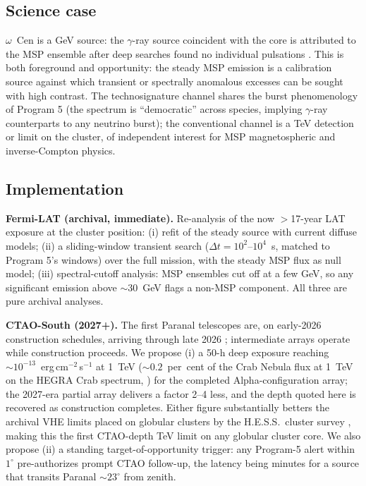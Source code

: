 \documentclass[11pt]{article}
\newcommand{\ocen}{\ensuremath{\omega}~Cen}
\begin{document}
\subsection{Science case}

\ocen{} is a GeV source: the $\gamma$-ray source coincident with the core is attributed to the MSP ensemble after deep searches found no individual pulsations \citep{Dai2020,Dai2023}. This is both foreground and opportunity: the steady MSP emission is a calibration source against which transient or spectrally anomalous excesses can be sought with high contrast. The technosignature channel shares the burst phenomenology of Program 5 (the \citealt{Dvali2023} spectrum is ``democratic'' across species, implying $\gamma$-ray counterparts to any neutrino burst); the conventional channel is a TeV detection or limit on the cluster, of independent interest for MSP magnetospheric and inverse-Compton physics.

\subsection{Implementation}

\textbf{Fermi-LAT (archival, immediate).} Re-analysis of the now $>$17-year LAT exposure at the cluster position: (i) refit of the steady source with current diffuse models; (ii) a sliding-window transient search ($\Delta t = 10^{2}$--$10^{4}$~s, matched to Program 5's windows) over the full mission, with the steady MSP flux as null model; (iii) spectral-cutoff analysis: MSP ensembles cut off at a few GeV, so any significant emission above $\sim$30~GeV flags a non-MSP component. All three are pure archival analyses.

\textbf{CTAO-South (2027+).} The first Paranal telescopes are, on early-2026 construction schedules, arriving through late 2026 \citep{CTAConsortium2019}; intermediate arrays operate while construction proceeds. We propose (i) a 50-h deep exposure reaching $\sim 10^{-13}$~erg\,cm$^{-2}$\,s$^{-1}$ at 1~TeV ($\sim0.2$~per~cent of the Crab Nebula flux at 1~TeV on the HEGRA Crab spectrum, \citealt{Aharonian2000HEGRACrab}) for the completed Alpha-configuration array; the 2027-era partial array delivers a factor 2--4 less, and the depth quoted here is recovered as construction completes. Either figure substantially betters the archival VHE limits placed on globular clusters by the H.E.S.S.\ cluster survey \citep{HESS2013}, making this the first CTAO-depth TeV limit on any globular cluster core. We also propose (ii) a standing target-of-opportunity trigger: any Program-5 alert within $1^{\circ}$ pre-authorizes prompt CTAO follow-up, the latency being minutes for a source that transits Paranal $\sim 23^{\circ}$ from zenith.
\end{document}
